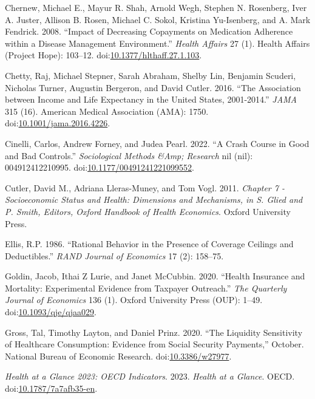 \documentclass[a4paper,12pt]{article}
\begin{document}
\hypertarget{citeproc_bib_item_6}{Chernew, Michael E., Mayur R. Shah, Arnold Wegh, Stephen N. Rosenberg, Iver A. Juster, Allison B. Rosen, Michael C. Sokol, Kristina Yu-Isenberg, and A. Mark Fendrick. 2008. “Impact of Decreasing Copayments on Medication Adherence within a Disease Management Environment.” \textit{Health Affairs} 27 (1). Health Affairs (Project Hope): 103–12. doi:\href{https://doi.org/10.1377/hlthaff.27.1.103}{10.1377/hlthaff.27.1.103}.}

\hypertarget{citeproc_bib_item_7}{Chetty, Raj, Michael Stepner, Sarah Abraham, Shelby Lin, Benjamin Scuderi, Nicholas Turner, Augustin Bergeron, and David Cutler. 2016. “The Association between Income and Life Expectancy in the United States, 2001-2014.” \textit{JAMA} 315 (16). American Medical Association (AMA): 1750. doi:\href{https://doi.org/10.1001/jama.2016.4226}{10.1001/jama.2016.4226}.}

\hypertarget{citeproc_bib_item_8}{Cinelli, Carlos, Andrew Forney, and Judea Pearl. 2022. “A Crash Course in Good and Bad Controls.” \textit{Sociological Methods \&Amp; Research} nil (nil): 004912412210995. doi:\href{https://doi.org/10.1177/00491241221099552}{10.1177/00491241221099552}.}

\hypertarget{citeproc_bib_item_9}{Cutler, David M., Adriana Lleras-Muney, and Tom Vogl. 2011. \textit{Chapter 7 - Socioeconomic Status and Health: Dimensions and Mechanisms, in S. Glied and P. Smith, Editors, Oxford Handbook of Health Economics}. Oxford University Press.}

\hypertarget{citeproc_bib_item_10}{Ellis, R.P. 1986. “Rational Behavior in the Presence of Coverage Ceilings and Deductibles.” \textit{RAND Journal of Economics} 17 (2): 158–75.}

\hypertarget{citeproc_bib_item_11}{Goldin, Jacob, Ithai Z Lurie, and Janet McCubbin. 2020. “Health Insurance and Mortality: Experimental Evidence from Taxpayer Outreach.” \textit{The Quarterly Journal of Economics} 136 (1). Oxford University Press (OUP): 1–49. doi:\href{https://doi.org/10.1093/qje/qjaa029}{10.1093/qje/qjaa029}.}

\hypertarget{citeproc_bib_item_12}{Gross, Tal, Timothy Layton, and Daniel Prinz. 2020. “The Liquidity Sensitivity of Healthcare Consumption: Evidence from Social Security Payments,” October. National Bureau of Economic Research. doi:\href{https://doi.org/10.3386/w27977}{10.3386/w27977}.}

\hypertarget{citeproc_bib_item_13}{\textit{Health at a Glance 2023: OECD Indicators}. 2023. \textit{Health at a Glance}. OECD. doi:\href{https://doi.org/10.1787/7a7afb35-en}{10.1787/7a7afb35-en}.}
\end{document}
